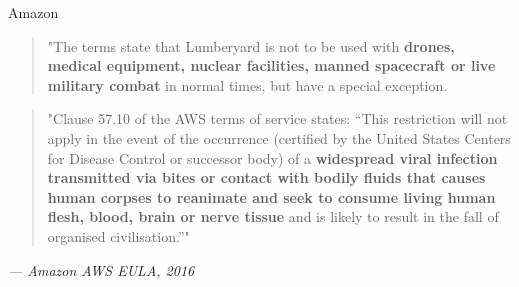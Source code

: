 \begin{frame}{Amazon}
    \begin{quote}
    "The terms state that Lumberyard is not to be used with \textbf{drones, medical equipment, nuclear facilities, manned spacecraft or live military combat} in normal times, but have a special exception.   
    \end{quote}  
    \pause
    \begin{quote}
        "Clause 57.10 of the AWS terms of service states: “This restriction will not apply in the event of the occurrence (certified by the United States Centers for Disease Control or successor body) 
        of a \textbf{widespread viral infection transmitted via bites or contact with bodily fluids that causes human corpses to reanimate and seek to consume living human flesh, blood, brain or nerve tissue} and is 
        likely to result in the fall of organised civilisation.”"    
    \end{quote}
    \mbox{}\hfill\textit{--- Amazon AWS EULA, 2016}      \cite{GUARDIAN_AWS_ZOMBIE}
\end{frame}

